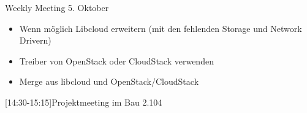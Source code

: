 \begin{Protokoll}{Weekly Meeting 5. Oktober}
\begin{itemize}
  \item Wenn möglich Libcloud erweitern (mit den fehlenden Storage und Network Drivern)
\end{itemize}

\begin{itemize}
  \item Treiber von OpenStack oder CloudStack verwenden
  \item Merge aus libcloud und OpenStack/CloudStack
\end{itemize}

[14:30-15:15]{Projektmeeting im Bau 2.104}

\end{Protokoll}

